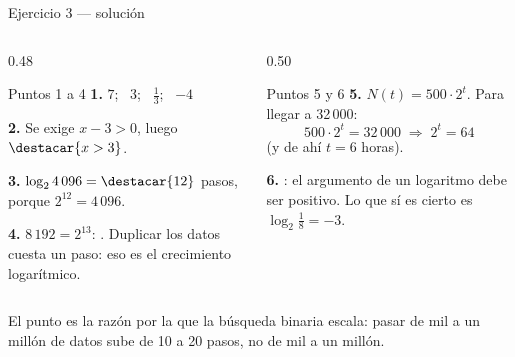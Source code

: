 \documentclass[aspectratio=169,10pt]{beamer}
\begin{document}
\begin{frame}{Ejercicio 3 — solución}
  \scriptsize
  \begin{columns}[T,onlytextwidth]
    \begin{column}{0.48\textwidth}
      \begin{block}{Puntos 1 a 4}
        \tiny
        \textbf{1.} $7$; \ $3$; \ $\tfrac{1}{3}$; \ $-4$

        \vspace{0.06cm}
        \textbf{2.} Se exige $x-3 > 0$, luego $\destacar{x > 3}$.

        \vspace{0.06cm}
        \textbf{3.} $\log_{2}4\,096 = \destacar{12}$ pasos, porque
        $2^{12}=4\,096$.

        \vspace{0.06cm}
        \textbf{4.} $8\,192 = 2^{13}$: . Duplicar
        los datos cuesta un paso: eso es el crecimiento logarítmico.
      \end{block}
    \end{column}
    \begin{column}{0.50\textwidth}
      \begin{alertblock}{Puntos 5 y 6}
        \tiny
        \textbf{5.} $N(t) = 500\cdot 2^{t}$. Para llegar a 32\,000:
        \[ 500\cdot 2^{t} = 32\,000 \;\Rightarrow\; 2^{t} = 64 \]
        (y de ahí $t = 6$ horas).

        \vspace{0.08cm}
        \textbf{6.} : el argumento de un logaritmo debe ser
        positivo. Lo que sí es cierto es $\log_{2}\tfrac{1}{8} = -3$.
      \end{alertblock}
    \end{column}
  \end{columns}

  \vspace{0.05cm}
  {\tiny\color{uniGris} El punto  es la razón por la que la
  búsqueda binaria escala: pasar de mil a un millón de datos sube de 10 a 20
  pasos, no de mil a un millón.}
\end{frame}
\end{document}
